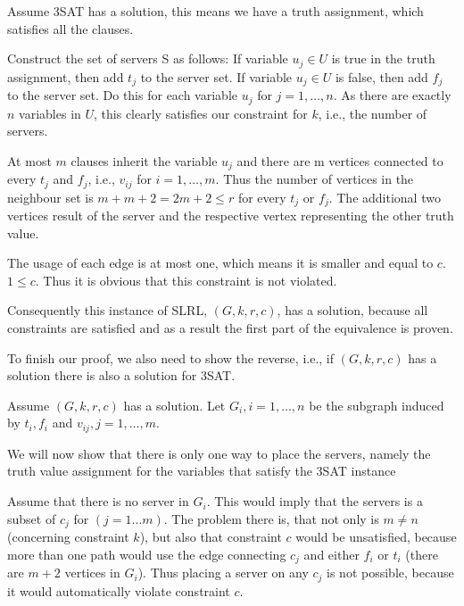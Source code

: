 \documentclass [12pt]{article}
\begin{document}
\noindent
  Assume 3SAT has a solution, this means we have a truth assignment, 
    which satisfies all the clauses.
\medskip

\noindent
  Construct the set of servers S as follows: If variable $u_j \in U$ is true
      in the truth assignment, then add $t_j$ to the server set. If variable $u_j \in U$
      is false, then add $f_j$ to the server set. Do this for each variable $u_j$ for $j = 1,\dots,n$.
      As there are exactly $n$ variables in $U$, this clearly satisfies our constraint 
    for $k$, i.e., the number of servers.
\medskip

\noindent
  At most $m$ clauses inherit the variable $u_j$ and there are m vertices connected to every
      $t_j$ and $f_j$, i.e., $v_{ij}$ for $i=1,\dots,m$.
      Thus the number of vertices in the neighbour set is $m+m+2 = 2m+2 \leq r $ for every 
      $t_j$ or $f_j$. The additional two vertices result of the server and the respective 
    vertex representing the other truth value.
\medskip

\noindent
  The usage of each edge is at most one, which means it is smaller and equal to $c$. $1\leq c$.
    Thus it is obvious that this constraint is not violated.
\medskip

\noindent
  Consequently this instance of SLRL, $(G,k,r,c)$, has a solution, because all constraints are satisfied 
    and as a result the first part of the equivalence is proven.
\medskip

\noindent
To finish our proof, we also need to show the reverse, i.e., 
if $(G,k,r,c)$ has a solution there is also a solution for 3SAT. 
  \medskip

  \noindent
  Assume $(G,k,r,c)$ has a solution. Let $G_i, i=1,\dots,n$ be the subgraph induced
    by $t_i, f_i$ and $v_{ij},j=1,\dots,m$.
  \medskip

  \noindent
  We will now show that there is only one way to place the servers, namely the truth
    value assignment for the variables that satisfy the 3SAT instance
  \medskip

  \noindent
  Assume that there is no server in $G_i$. This would imply that the servers is a subset of
      $c_j$ for $(j=1\dots m)$. The problem there is, that not only is $m \neq n$ (concerning constraint $k$),
      but also that constraint $c$ would be unsatisfied, because more than one path would use 
      the edge connecting $c_j$ and either $f_i$ or $t_i$ (there are $m + 2$ vertices in $G_i$).
    Thus placing a server on any $c_j$ is not possible, because it would automatically violate constraint $c$.
  \medskip
\end{document}
